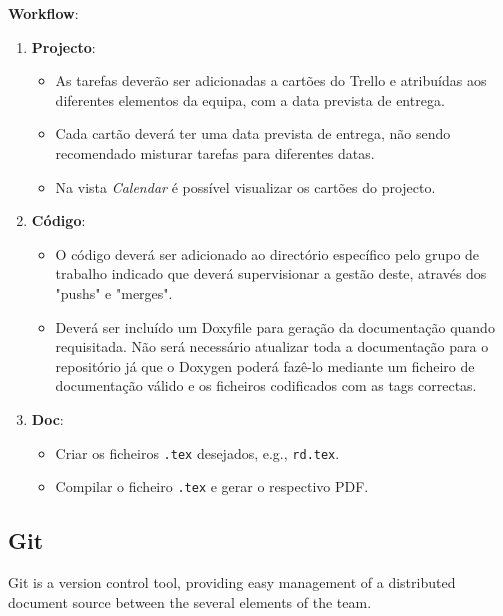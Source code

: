\documentclass[11pt]{article}
\begin{document}
\textbf{Workflow}:
\begin{enumerate}
\item \textbf{Projecto}:
\begin{itemize}
\item As tarefas deverão ser adicionadas a cartões do Trello e atribuídas aos
diferentes elementos da equipa, com a data prevista de entrega.
\item Cada cartão deverá ter uma data prevista de entrega, não sendo recomendado
misturar tarefas para diferentes datas.
\item Na vista \emph{Calendar} é possível visualizar os cartões do projecto.
\end{itemize}
\item \textbf{Código}:
\begin{itemize}
\item O código deverá ser adicionado ao directório específico pelo grupo de
trabalho indicado que deverá supervisionar a gestão deste, através dos
"pushs" e "merges".
\item Deverá ser incluído um Doxyfile para geração da documentação quando
requisitada. Não será necessário atualizar toda a documentação para o
repositório já que o Doxygen poderá fazê-lo mediante um ficheiro de
documentação válido e os ficheiros codificados com as tags correctas.
\end{itemize}
\item \textbf{Doc}:
\begin{itemize}
\item Criar os ficheiros \texttt{.tex} desejados, e.g., \texttt{rd.tex}.
\item Compilar o ficheiro \texttt{.tex} e gerar o respectivo PDF.
\end{itemize}
\end{enumerate}

\subsection{Git}
\label{sec:org2f8e126}
Git is a version control tool, providing easy management of a distributed
document source between the several elements of the team.
\end{document}

